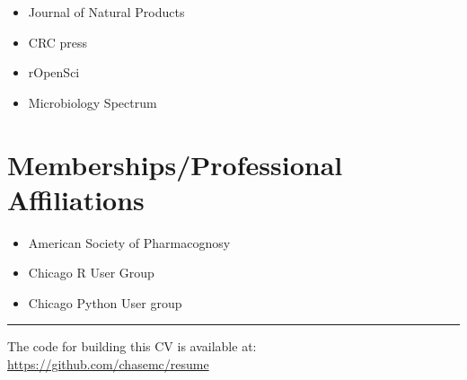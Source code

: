 \documentclass[11pt,a4paper,]{awesome-cv}
\providecommand{\tightlist}{%
	\setlength{\itemsep}{0pt}\setlength{\parskip}{0pt}}
\begin{document}
\begin{itemize}
\item
  Journal of Natural Products
\item
  CRC press
\item
  rOpenSci
\item
  Microbiology Spectrum
\end{itemize}

\hypertarget{membershipsprofessional-affiliations}{%
\section{Memberships/Professional
Affiliations}\label{membershipsprofessional-affiliations}}

\begin{itemize}
\tightlist
\item
  American Society of Pharmacognosy
\item
  Chicago R User Group
\item
  Chicago Python User group
\end{itemize}

\begin{center}\rule{0.5\linewidth}{0.5pt}\end{center}

The code for building this CV is available at:
\url{https://github.com/chasemc/resume}
\end{document}
